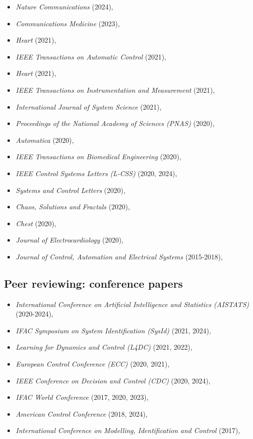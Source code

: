 \documentclass[10pt,A4]{article} %
\begin{document}
\begin{itemize}
 \item {\em Nature Communications } (2024),  \item {\em Communications Medicine } (2023),  \item {\em Heart } (2021),  \item {\em IEEE Transactions on Automatic Control } (2021),  \item {\em Heart } (2021),  \item {\em IEEE Transactions on Instrumentation and Measurement } (2021),  \item {\em International Journal of System Science } (2021),  \item {\em Proceedings of the National Academy of Sciences (PNAS) } (2020),  \item {\em Automatica } (2020),  \item {\em IEEE Transactions on Biomedical Engineering } (2020),  \item {\em IEEE Control Systems Letters (L-CSS) } (2020, 2024),  \item {\em Systems and Control Letters } (2020),  \item {\em Chaos, Solutions and Fractals } (2020),  \item {\em Chest } (2020),  \item {\em Journal of Electrocardiology } (2020),  \item {\em Journal of Control, Automation and Electrical Systems } (2015-2018), 
\end{itemize}

\subsection{Peer reviewing: conference papers}

\begin{itemize}
  
  \item {\em International Conference on Artificial Intelligence and Statistics (AISTATS) } (2020-2024),
    
  \item {\em IFAC Symposium on System Identification (SysId) } (2021, 2024),
    
  \item {\em Learning for Dynamics and Control (L4DC) } (2021, 2022),
    
  \item {\em European Control Conference (ECC) } (2020, 2021),
    
  \item {\em IEEE Conference on Decision and Control (CDC) } (2020, 2024),
    
  \item {\em IFAC World Conference } (2017, 2020, 2023),
    
  \item {\em American Control Conference } (2018, 2024),
    
  \item {\em International Conference on Modelling, Identification and Control } (2017),
    
\end{itemize}
  
\end{document}

